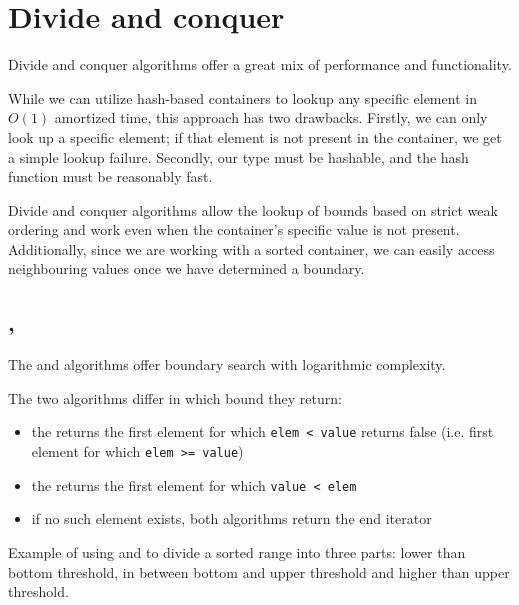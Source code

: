 \section{Divide and conquer}

Divide and conquer algorithms offer a great mix of performance and functionality.

While we can utilize hash-based containers to lookup any specific element in $O(1)$ amortized time, this approach has two drawbacks. Firstly, we can only look up a specific element; if that element is not present in the container, we get a simple lookup failure. Secondly, our type must be hashable, and the hash function must be reasonably fast.

Divide and conquer algorithms allow the lookup of bounds based on strict weak ordering and work even when the container’s specific value is not present. Additionally, since we are working with a sorted container, we can easily access neighbouring values once we have determined a boundary.

\subsection{\texorpdfstring{, }{\texttt{std::lower\_bound}, \texttt{std::upper\_bound}}}

The  and  algorithms offer boundary search with logarithmic complexity.


\noindent The two algorithms differ in which bound they return:

\begin{itemize}
    \item the  returns the first element for which \texttt{elem < value} returns false (i.e. first element for which \texttt{elem >= value})
    \item the  returns the first element for which \texttt{value < elem}
    \item if no such element exists, both algorithms return the end iterator
\end{itemize}



\begin{box-note}
\footnotesize Example of using  and  to divide a sorted range into three parts: lower than bottom threshold, in between bottom and upper threshold and higher than upper threshold.
\tcblower
{}
\end{box-note}

